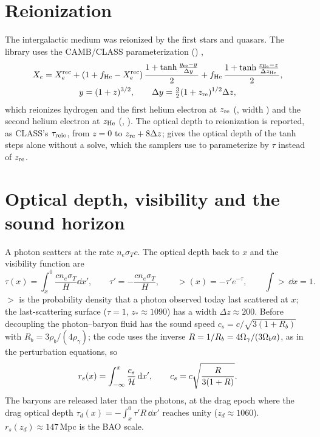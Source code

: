 \section{Reionization}

The intergalactic medium was reionized by the first stars and quasars. The library uses the CAMB/CLASS
parameterization () \cite{Lewis2008},
\begin{gather}
X_e=X_e^{\rm rec}+\left(1+f_{\rm He}-X_e^{\rm rec}\right)\frac{1+\tanh\frac{y_{\rm re}-y}{\Delta y}}{2}
+f_{\rm He}\,\frac{1+\tanh\frac{z_{\rm He}-z}{\Delta z_{\rm He}}}{2},\\
y=(1+z)^{3/2},\qquad \Delta y=\tfrac32(1+z_{\rm re})^{1/2}\Delta z,
\end{gather}
which reionizes hydrogen and the first helium electron at $z_{\rm re}$ (, width
) and the second helium electron at $z_{\rm He}$ (,
). The optical depth to reionization is reported, as CLASS's $\tau_{\rm reio}$, from $z=0$ to
$z_{\rm re}+8\Delta z$;  gives the optical depth of the tanh steps alone without a
solve, which the samplers use to parameterize by $\tau$ instead of $z_{\rm re}$.

\section{Optical depth, visibility and the sound horizon}

A photon scatters at the rate $n_e\sigma_Tc$. The optical depth back to $x$ and the visibility function are
\begin{equation}
\tau(x)=\int_x^0\frac{cn_e\sigma_T}{H}\dd x',\qquad \tau'=-\frac{cn_e\sigma_T}{H},\qquad
\gt(x)=-\tau'e^{-\tau},\qquad \int\gt\,\dd x=1 .
\end{equation}
$\gt$ is the probability density that a photon observed today last scattered at $x$; the last-scattering surface
($\tau=1$, $z_*\approx1090$) has a width $\Delta z\approx200$. Before decoupling the photon--baryon fluid has the sound
speed $c_s=c/\sqrt{3(1+R_b)}$ with $R_b=3\rho_b/(4\rho_\gamma)$; the code uses the inverse $R=1/R_b=4\Omega_\gamma/(3\Omega_ba)$,
as in the perturbation equations, so
\begin{equation}
r_s(x)=\int_{-\infty}^x\frac{c_s}{\mathcal{H}}\,\mathrm{d} x',\qquad c_s=c\sqrt{\frac{R}{3(1+R)}} .
\end{equation}
The baryons are released later than the photons, at the drag epoch where the drag optical depth
$\tau_d(x)=-\int_x^0\tau'R\,\dd x'$ reaches unity ($z_d\approx1060$). $r_s(z_d)\approx147$\,Mpc is the BAO scale.

